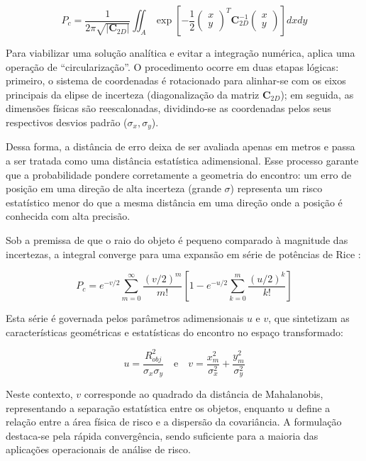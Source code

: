 \begin{equation}
    P_c = \frac{1}{2\pi \sqrt{|\mathbf{C}_{2D}|}} \iint_{A} \exp \left[ -\frac{1}{2} \begin{pmatrix} x \\ y \end{pmatrix}^T \mathbf{C}_{2D}^{-1} \begin{pmatrix} x \\ y \end{pmatrix} \right] dx dy
\end{equation}

Para viabilizar uma solução analítica e evitar a integração numérica,  aplica uma operação de ``circularização''. O procedimento ocorre em duas etapas lógicas: primeiro, o sistema de coordenadas é rotacionado para alinhar-se com os eixos principais da elipse de incerteza (diagonalização da matriz $\mathbf{C}_{2D}$); em seguida, as dimensões físicas são reescalonadas, dividindo-se as coordenadas pelos seus respectivos desvios padrão ($\sigma_x, \sigma_y$).

Dessa forma, a distância de erro deixa de ser avaliada apenas em metros e passa a ser tratada como uma distância estatística adimensional. Esse processo garante que a probabilidade pondere corretamente a geometria do encontro: um erro de posição em uma direção de alta incerteza (grande $\sigma$) representa um risco estatístico menor do que a mesma distância em uma direção onde a posição é conhecida com alta precisão.

Sob a premissa de que o raio do objeto é pequeno comparado à magnitude das incertezas, a integral converge para uma expansão em série de potências de Rice \cite{Akella2000}:

\begin{equation}
    P_c = e^{-v/2} \sum_{m=0}^{\infty} \frac{(v/2)^m}{m!} \left[ 1 - e^{-u/2} \sum_{k=0}^{m} \frac{(u/2)^k}{k!} \right]
\end{equation}

Esta série é governada pelos parâmetros adimensionais $u$ e $v$, que sintetizam as características geométricas e estatísticas do encontro no espaço transformado:

\begin{equation}
    u = \frac{R_{obj}^2}{\sigma_x \sigma_y} \quad \text{e} \quad v = \frac{x_m^2}{\sigma_x^2} + \frac{y_m^2}{\sigma_y^2}
\end{equation}

Neste contexto, $v$ corresponde ao quadrado da distância de Mahalanobis, representando a separação estatística entre os objetos, enquanto $u$ define a relação entre a área física de risco e a dispersão da covariância. A formulação destaca-se pela rápida convergência, sendo suficiente para a maioria das aplicações operacionais de análise de risco.

